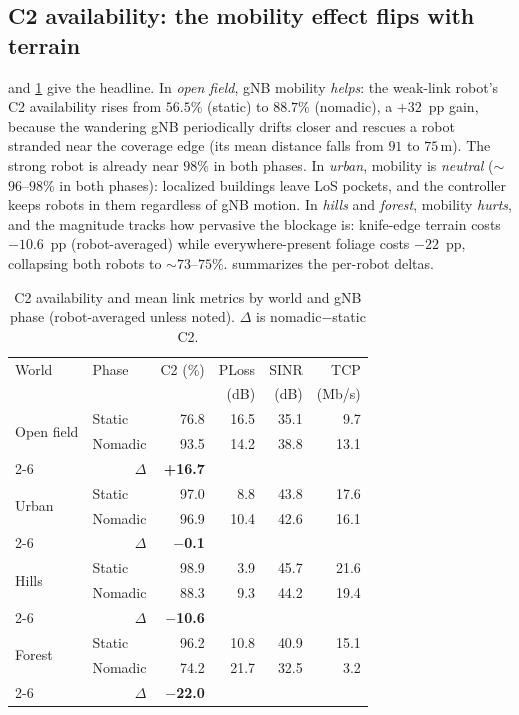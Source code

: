 \documentclass[conference]{IEEEtran}
\begin{document}
\subsection{C2 availability: the mobility effect flips with terrain}
 and \cref{tab:main} give the headline. In \emph{open field}, gNB
mobility \emph{helps}: the weak-link robot's C2 availability rises from $56.5\%$
(static) to $88.7\%$ (nomadic), a $+32$~pp gain, because the wandering gNB
periodically drifts closer and rescues a robot stranded near the coverage edge
(its mean distance falls from $91$ to $75$\,m). The strong robot is already near
$98\%$ in both phases. In \emph{urban}, mobility is \emph{neutral}
($\sim$$96$--$98\%$ in both phases): localized buildings leave LoS pockets, and the
controller keeps robots in them regardless of gNB motion. In \emph{hills} and
\emph{forest}, mobility \emph{hurts}, and the magnitude tracks how pervasive the
blockage is: knife-edge terrain costs $-10.6$~pp (robot-averaged) while
everywhere-present foliage costs $-22$~pp, collapsing both robots to
$\sim$$73$--$75\%$.  summarizes the per-robot deltas.

\begin{table}[t]
\centering
\caption{C2 availability and mean link metrics by world and gNB phase
(robot-averaged unless noted). $\Delta$ is nomadic$-$static C2.}
\label{tab:main}
\footnotesize
\begin{tabular}{@{}llrrrr@{}}
\toprule
World & Phase & C2 (\%) & PLoss & SINR & TCP \\
      &       &         & (dB)  & (dB) & (Mb/s) \\
\midrule
\multirow{2}{*}{Open field}
 & Static  & 76.8 & 16.5 & 35.1 & 9.7  \\
 & Nomadic & 93.5 & 14.2 & 38.8 & 13.1 \\
\cmidrule(l){2-6}
 & \multicolumn{1}{r}{$\Delta$} & \textbf{+16.7} & & & \\
\midrule
\multirow{2}{*}{Urban}
 & Static  & 97.0 & 8.8  & 43.8 & 17.6 \\
 & Nomadic & 96.9 & 10.4 & 42.6 & 16.1 \\
\cmidrule(l){2-6}
 & \multicolumn{1}{r}{$\Delta$} & \textbf{$-$0.1} & & & \\
\midrule
\multirow{2}{*}{Hills}
 & Static  & 98.9 & 3.9  & 45.7 & 21.6 \\
 & Nomadic & 88.3 & 9.3  & 44.2 & 19.4 \\
\cmidrule(l){2-6}
 & \multicolumn{1}{r}{$\Delta$} & \textbf{$-$10.6} & & & \\
\midrule
\multirow{2}{*}{Forest}
 & Static  & 96.2 & 10.8 & 40.9 & 15.1 \\
 & Nomadic & 74.2 & 21.7 & 32.5 & 3.2  \\
\cmidrule(l){2-6}
 & \multicolumn{1}{r}{$\Delta$} & \textbf{$-$22.0} & & & \\
\bottomrule
\end{tabular}
\end{table}
\end{document}
